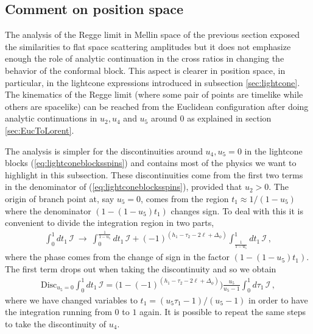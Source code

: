 \subsection{Comment on position space}
The analysis of the Regge limit in Mellin space of the previous section exposed the similarities to flat space scattering amplitudes but it does not emphasize enough the role of analytic continuation in the cross ratios in changing the behavior of the conformal block. This aspect is clearer in  position space, in particular, in the lightcone expressions introduced in subsection \ref{sec:lightcone}. The kinematics of the Regge limit (where some pair of points are timelike while others are spacelike) can be reached from the
Euclidean configuration after doing analytic continuations in $u_2,u_4$ and $u_5$ around $0$ as explained in section \ref{sec:EucToLorent}.

The analysis is simpler for the discontinuities around  $u_4, u_5=0$ in the lightcone blocks (\ref{eq:lightconeblocksspins}) and contains most of the physics we want to highlight in this subsection. These discontinuities come from the first two terms in the denominator of (\ref{eq:lightconeblocksspins}),  provided that $u_2> 0$.
The origin of branch point at, say $u_5=0$, comes from the region $t_1 \approx 1/(1-u_5)$ where the denominator $(1-(1-u_5)t_1)$ changes sign. To deal with this it is convenient to divide the integration region in two parts, 
\begin{align}
  \int_{0}^{1} dt_1 \,\mathcal{I}\ \rightarrow \   \int_{0}^{\frac{1}{1-u_5}} dt_1 \,\mathcal{I}+(-1)^{(h_1-\tau_2-2\ell+\Delta_\phi )} \int_{\frac{1}{1-u_5}} ^{1} dt_1\,\mathcal{I}\,,
\end{align}
where the phase comes from the change of sign in the factor $(1-(1-u_5)t_1)$. The first term drops out when taking the discontinuity and so we obtain
\begin{align}
  \textrm{Disc}_{u_5=0} \int_{0}^{1} dt_1\, \mathcal{I}= \big( 1-(-1)^{(h_1-\tau_2-2\ell+\Delta_\phi )} \big) \frac{u_5}{u_5-1}\int_{0}^{1} d\tau_1 \,\mathcal{I}\,,
\end{align}
where we have changed variables to $t_1 = (u_5\tau_1 -1)/(u_5-1)$ in order to have the integration running from $0$ to $1$ again.
It is possible to repeat the same steps to take the discontinuity of $u_4$.

